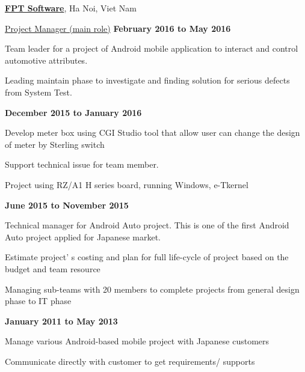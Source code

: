 \documentclass[10pt]{article}
\renewcommand\textit[1]{\underline{#1}}
\begin{document}
\href{http://fpt-software.com}{\textbf{FPT Software}},
Ha Noi, Viet Nam
\begin{outerlist}

    \item[] \textit{Project Manager (main role)}%
            \hfill \textbf{February 2016 to May 2016}
            \begin{innerlist}
                \item Team leader for a project of Android mobile application to interact and control automotive attributes.

                \item Leading maintain phase to investigate and finding solution for serious defects from System Test.
            \end{innerlist}      
            \hfill \textbf{December 2015 to January 2016}   
            \begin{innerlist}
                \item Develop meter box using CGI Studio tool that allow user can change the design of meter by Sterling switch
                \item Support technical issue for team member.
                \item Project using RZ/A1 H series board, running Windows, e-Tkernel
            \end{innerlist}                    
            \hfill \textbf{June 2015 to November 2015}          
            \begin{innerlist}
                \item Technical manager for Android Auto project. This is one of the first Android Auto project applied for Japanese market.

                \item Estimate  project' s  costing  and  plan  for  full  life-cycle  of  project  based  on  the  budget  and team  resource

	     \item  Managing sub-teams with 20 members  to  complete  projects  from  general design  phase  to  IT  phase 
            \end{innerlist}    
            \hfill \textbf{January 2011 to May 2013}
            \begin{innerlist}
                \item Manage  various  Android-based mobile  project  with  Japanese  customers

                \item Communicate  directly  with  customer  to  get  requirements/ supports


\end{innerlist}
\end{outerlist}
\end{document}
